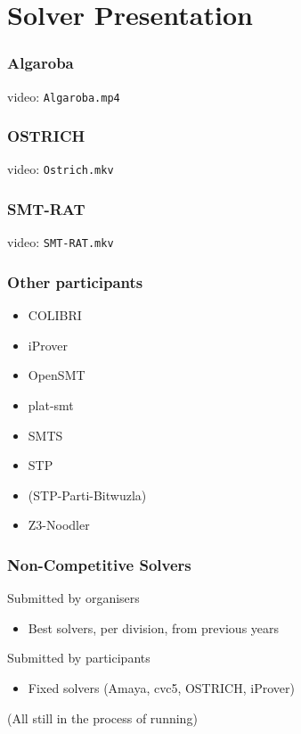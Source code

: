 \documentclass[table]{beamer}
\begin{document}
\section{Solver Presentation}

\newcommand{\myincludepdf}[1]{
\begin{frame}
  \vspace*{-1pt}%
  \noindent\makebox[\textwidth]{%
    \texttt{[image: \#1]}}
\end{frame}
}

\newcommand{\myvideopdf}[2]{
\begin{frame}
  \frametitle{#1}
  \begin{center}
    video: \texttt{#2}    
  \end{center}
\end{frame}
}

\myvideopdf{Algaroba}{Algaroba.mp4}

\myincludepdf{amaya.pdf}

\myincludepdf{Bitwuzla.pdf}

\myincludepdf{cvc5.pdf}

\myvideopdf{OSTRICH}{Ostrich.mkv}

\myincludepdf{smtinterpol.pdf}

\myvideopdf{SMT-RAT}{SMT-RAT.mkv}

\myincludepdf{Yices2.pdf}

\myincludepdf{YicesQS.pdf}

\myincludepdf{z3-alpha.pdf}

\myincludepdf{Z3-Parti-Z3++.pdf}

\begin{frame}
    \frametitle{Other participants}
    \begin{itemize}
\item COLIBRI
\item iProver
\item OpenSMT
\item plat-smt
\item SMTS
\item STP
\item (STP-Parti-Bitwuzla)
\item Z3-Noodler
    \end{itemize}
  \end{frame}


\begin{frame}
  \frametitle{Non-Competitive Solvers}

  Submitted by organisers
  \begin{itemize}
  \item Best solvers, per division, from previous years
  \end{itemize}
  \bigskip

  Submitted by participants
  \begin{itemize}
  \item Fixed solvers (Amaya, cvc5, OSTRICH, iProver)  
  \end{itemize}
  \bigskip
  \bigskip
  (All still in the process of running)
\end{frame}
\end{document}
